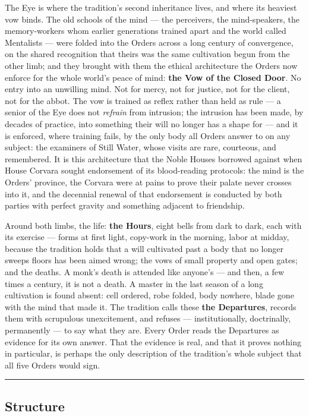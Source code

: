 The Eye is where the tradition's second inheritance lives, and where its heaviest vow binds. The old schools of the mind --- the perceivers, the mind-speakers, the memory-workers whom earlier generations trained apart and the world called Mentalists --- were folded into the Orders across a long century of convergence, on the shared recognition that theirs was the same cultivation begun from the other limb; and they brought with them the ethical architecture the Orders now enforce for the whole world's peace of mind: \textbf{the Vow of the Closed Door}. No entry into an unwilling mind. Not for mercy, not for justice, not for the client, not for the abbot. The vow is trained as reflex rather than held as rule --- a senior of the Eye does not \textit{refrain} from intrusion; the intrusion has been made, by decades of practice, into something their will no longer has a shape for --- and it is enforced, where training fails, by the only body all Orders answer to on any subject: the examiners of Still Water, whose visits are rare, courteous, and remembered. It is this architecture that the Noble Houses borrowed against when House Corvara sought endorsement of its blood-reading protocols: the mind is the Orders' province, the Corvara were at pains to prove their palate never crosses into it, and the decennial renewal of that endorsement is conducted by both parties with perfect gravity and something adjacent to friendship.

Around both limbs, the life: \textbf{the Hours}, eight bells from dark to dark, each with its exercise --- forms at first light, copy-work in the morning, labor at midday, because the tradition holds that a will cultivated past a body that no longer sweeps floors has been aimed wrong; the vows of small property and open gates; and the deaths. A monk's death is attended like anyone's --- and then, a few times a century, it is not a death. A master in the last season of a long cultivation is found absent: cell ordered, robe folded, body nowhere, blade gone with the mind that made it. The tradition calls these \textbf{the Departures}, records them with scrupulous unexcitement, and refuses --- institutionally, doctrinally, permanently --- to say what they are. Every Order reads the Departures as evidence for its own answer. That the evidence is real, and that it proves nothing in particular, is perhaps the only description of the tradition's whole subject that all five Orders would sign.

\medskip\hrule\medskip

\subsection{Structure}

